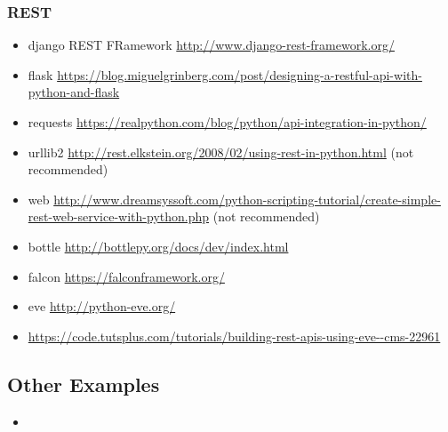 \subsubsection{REST}
\label{\detokenize{lesson/prg/python_big_data:rest}}\begin{itemize}
\item {} 
django REST FRamework \url{http://www.django-rest-framework.org/}

\item {} 
flask \url{https://blog.miguelgrinberg.com/post/designing-a-restful-api-with-python-and-flask}

\item {} 
requests
\url{https://realpython.com/blog/python/api-integration-in-python/}

\item {} 
urllib2 \url{http://rest.elkstein.org/2008/02/using-rest-in-python.html}
(not recommended)

\item {} 
web
\url{http://www.dreamsyssoft.com/python-scripting-tutorial/create-simple-rest-web-service-with-python.php}
(not recommended)

\item {} 
bottle \url{http://bottlepy.org/docs/dev/index.html}

\item {} 
falcon \url{https://falconframework.org/}

\item {} 
eve \url{http://python-eve.org/}

\item {} 
\url{https://code.tutsplus.com/tutorials/building-rest-apis-using-eve--cms-22961}

\end{itemize}


\subsection{Other Examples}
\label{\detokenize{lesson/prg/python_big_data:other-examples}}\begin{itemize}
\item {} 
{\hyperref[\detokenize{lesson/prg/python_lesson1::doc}]{}}

\end{itemize}


